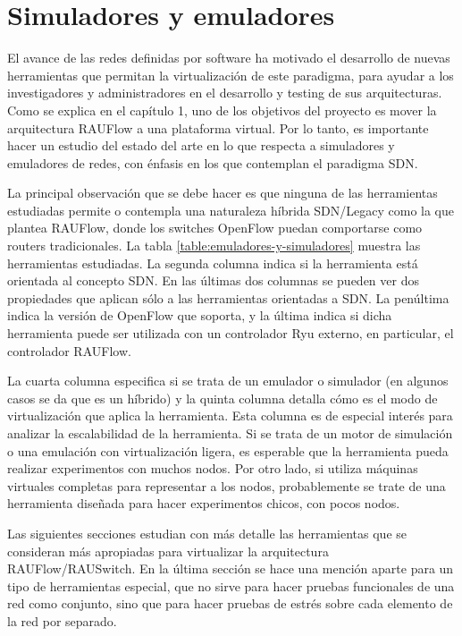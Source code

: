 \section{Simuladores y emuladores}
El avance de las redes definidas por software ha motivado el desarrollo de nuevas herramientas que permitan la virtualización de este paradigma, para ayudar a los investigadores y administradores en el desarrollo y testing de sus arquitecturas. Como se explica en el capítulo 1, uno de los objetivos del proyecto es mover la arquitectura RAUFlow a una plataforma virtual. Por lo tanto, es importante hacer un estudio del estado del arte en lo que respecta a simuladores y emuladores de redes, con énfasis en los que contemplan el paradigma SDN.

La principal observación que se debe hacer es que ninguna de las herramientas estudiadas permite o contempla una naturaleza híbrida SDN/Legacy como la que plantea RAUFlow, donde los switches OpenFlow puedan comportarse como routers tradicionales. La tabla \ref{table:emuladores-y-simuladores} muestra las herramientas estudiadas. La segunda columna indica si la herramienta está orientada al concepto SDN. En las últimas dos columnas se pueden ver dos propiedades que aplican sólo a las herramientas orientadas a SDN. La penúltima indica la versión de OpenFlow que soporta, y la última indica si dicha herramienta puede ser utilizada con un controlador Ryu externo, en particular, el controlador RAUFlow.

La cuarta columna especifica si se trata de un emulador o simulador (en algunos casos se da que es un híbrido) y la quinta columna detalla cómo es el modo de virtualización que aplica la herramienta. Esta columna es de especial interés para analizar la escalabilidad de la herramienta. Si se trata de un motor de simulación o una emulación con virtualización ligera, es esperable que la herramienta pueda realizar experimentos con muchos nodos. Por otro lado, si utiliza máquinas virtuales completas para representar a los nodos, probablemente se trate de una herramienta diseñada para hacer experimentos chicos, con pocos nodos.

Las siguientes secciones estudian con más detalle las herramientas que se consideran más apropiadas para virtualizar la arquitectura RAUFlow/RAUSwitch. En la última sección se hace una mención aparte para un tipo de herramientas especial, que no sirve para hacer pruebas funcionales de una red como conjunto, sino que para hacer pruebas de estrés sobre cada elemento de la red por separado.

